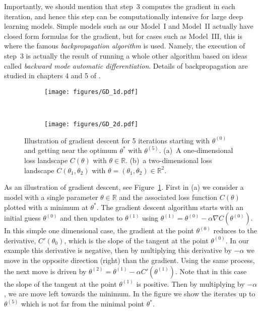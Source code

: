 Importantly, we should mention that step~3 computes the gradient in each iteration, and hence this step can be computationally intensive for large deep learning models. Simple models such as our Model~I and Model~II actually have closed form formulas for the gradient, but for cases such as Model~III, this is where the famous {\em backpropagation algorithm} is used. Namely, the  execution of step~3 is actually the result of running a whole other algorithm based on ideas called {\em backward mode automatic differentiation}. Details of backpropagation are studied in chapters 4 and 5 of \cite{LiquetMokaNazarathy2024DeepLearning}.

\begin{figure}[h!] 
  \begin{subfigure}[b]{0.5\linewidth}
    \centering
    \texttt{[image: figures/GD\_1d.pdf]}
    \caption{} 
    \vspace{2ex}
  \end{subfigure}%
  ~
  \begin{subfigure}[b]{0.5\linewidth}
    \centering
    \texttt{[image: figures/GD\_2d.pdf]}
    \caption{} 
    \vspace{2ex}
  \end{subfigure} 
    \caption{Illustration of gradient descent for 5 iterations starting with $\theta^{(0)}$ and getting near the optimum $\theta^*$ with $\theta^{(5)}$. (a)~A one-dimensional loss landscape $C(\theta)$ with $\theta \in \mathbb{R}$. (b)~a two-dimensional loss landscape $C(\theta_1,\theta_2)$ with $\theta = (\theta_1, \theta_2) \in \mathbb{R}^2$.}
    \label{simpleloss}
\end{figure}

As an illustration of gradient descent, see Figure~\ref{simpleloss}. First in (a) we consider a  model with a single parameter $\theta \in \mathbb{R}$ and the associated loss function $C(\theta)$ plotted with a minimum at $\theta^*$.  The gradient descent algorithm starts with an initial guess $\theta^{(0)}$ and then updates to $\theta^{(1)}$ using $\theta^{(1)} = \theta^{(0)} - \alpha \nabla C(\theta^{(0)})$. In this simple one dimensional case, the gradient at the point $\theta^{(0)}$ reduces to the derivative, $C'(\theta_0)$, which is the slope of the tangent at the point $\theta^{(0)}$. In our example this derivative is negative, then by multiplying this derivative by $-\alpha$ we move in the opposite direction (right) than the gradient. Using the same process, the next move is driven by $\theta^{(2)} = \theta^{(1)} - \alpha  C'(\theta^{(1)})$. Note that in this case the slope of the tangent at the point $\theta^{(1)}$ is positive. Then by multiplying by $- \alpha $, we are move left towards the minimum. In the figure we show the iterates up to $\theta^{(5)}$ which is not far from the minimal point $\theta^*$.

